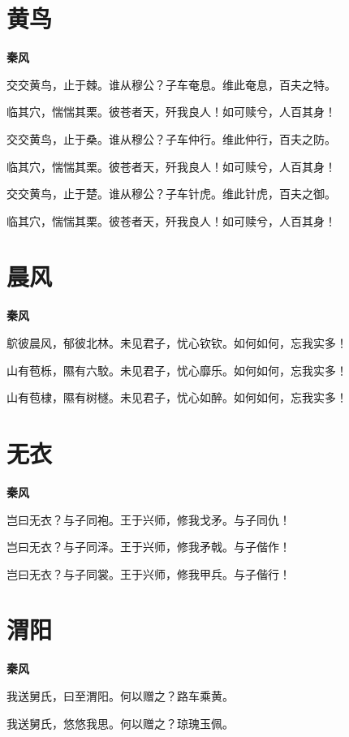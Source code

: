 \documentclass[12pt,a4paper]{ctexbook}
\begin{document}
\section{黄鸟}
\textbf{秦风}\par\vspace{0.5em}
交交黄鸟，止于棘。谁从穆公？子车奄息。维此奄息，百夫之特。\par
临其穴，惴惴其栗。彼苍者天，歼我良人！如可赎兮，人百其身！\par
交交黄鸟，止于桑。谁从穆公？子车仲行。维此仲行，百夫之防。\par
临其穴，惴惴其栗。彼苍者天，歼我良人！如可赎兮，人百其身！\par
交交黄鸟，止于楚。谁从穆公？子车针虎。维此针虎，百夫之御。\par
临其穴，惴惴其栗。彼苍者天，歼我良人！如可赎兮，人百其身！\par

\section{晨风}
\textbf{秦风}\par\vspace{0.5em}
鴥彼晨风，郁彼北林。未见君子，忧心钦钦。如何如何，忘我实多！\par
山有苞栎，隰有六駮。未见君子，忧心靡乐。如何如何，忘我实多！\par
山有苞棣，隰有树檖。未见君子，忧心如醉。如何如何，忘我实多！\par

\section{无衣}
\textbf{秦风}\par\vspace{0.5em}
岂曰无衣？与子同袍。王于兴师，修我戈矛。与子同仇！\par
岂曰无衣？与子同泽。王于兴师，修我矛戟。与子偕作！\par
岂曰无衣？与子同裳。王于兴师，修我甲兵。与子偕行！\par

\section{渭阳}
\textbf{秦风}\par\vspace{0.5em}
我送舅氏，曰至渭阳。何以赠之？路车乘黄。\par
我送舅氏，悠悠我思。何以赠之？琼瑰玉佩。\par
\end{document}
